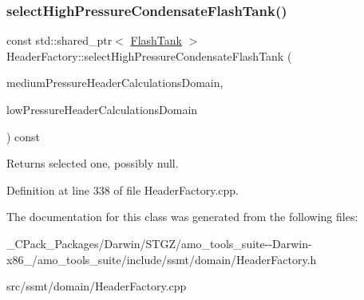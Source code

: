 \subsubsection{\texorpdfstring{select\+High\+Pressure\+Condensate\+Flash\+Tank()}{selectHighPressureCondensateFlashTank()}}
{\footnotesize\ttfamily const std\+::shared\+\_\+ptr$<$ \hyperlink{class_flash_tank}{Flash\+Tank} $>$ Header\+Factory\+::select\+High\+Pressure\+Condensate\+Flash\+Tank (\begin{DoxyParamCaption}\item[{const std\+::shared\+\_\+ptr$<$ \hyperlink{class_medium_pressure_header_calculations_domain}{Medium\+Pressure\+Header\+Calculations\+Domain} $>$ \&}]{medium\+Pressure\+Header\+Calculations\+Domain,  }\item[{const std\+::shared\+\_\+ptr$<$ \hyperlink{class_low_pressure_header_calculations_domain}{Low\+Pressure\+Header\+Calculations\+Domain} $>$ \&}]{low\+Pressure\+Header\+Calculations\+Domain }\end{DoxyParamCaption}) const}

\begin{DoxyReturn}{Returns}
selected one, possibly null. 
\end{DoxyReturn}


Definition at line 338 of file Header\+Factory.\+cpp.



The documentation for this class was generated from the following files\+:\begin{DoxyCompactItemize}
\item 
\+\_\+\+C\+Pack\+\_\+\+Packages/\+Darwin/\+S\+T\+G\+Z/amo\+\_\+tools\+\_\+suite-\/-\/\+Darwin-\/x86\+\_/amo\+\_\+tools\+\_\+suite/include/ssmt/domain/Header\+Factory.\+h\item 
src/ssmt/domain/Header\+Factory.\+cpp\end{DoxyCompactItemize}
